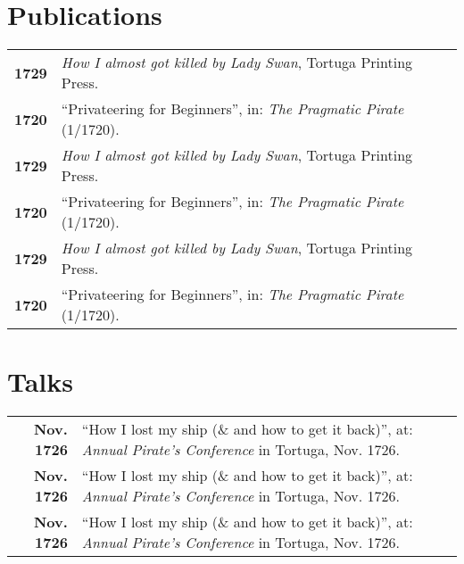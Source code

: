 \documentclass[english]{modernsimplecv}
\newlength{\rightcolwidth}
\begin{document}
\begin{paracol}{2}
{}
\bigskip

\begin{skillsection}{\rightcolwidth}
\end{skillsection}


\bigskip



\vspace{4em}


\begin{minipage}[t]{\rightcolwidth}
\section*{Publications}
\begin{tabular}{>{\footnotesize\bfseries}r >{\footnotesize}p{}}
    1729 & \emph{How I almost got killed by Lady Swan}, Tortuga Printing Press. \\
    1720 & ``Privateering for Beginners'', in: \emph{The Pragmatic Pirate} (1/1720).\\
    1729 & \emph{How I almost got killed by Lady Swan}, Tortuga Printing Press. \\
    1720 & ``Privateering for Beginners'', in: \emph{The Pragmatic Pirate} (1/1720).\\
    1729 & \emph{How I almost got killed by Lady Swan}, Tortuga Printing Press. \\
    1720 & ``Privateering for Beginners'', in: \emph{The Pragmatic Pirate} (1/1720).
\end{tabular}
\bigskip

\section*{Talks}
\begin{tabular}{>{\footnotesize\bfseries}r >{\footnotesize}p{}}
    Nov. 1726 & ``How I lost my ship (\& and how to get it back)'', at: \emph{Annual Pirate's Conference} in Tortuga, Nov. 1726. \\
    Nov. 1726 & ``How I lost my ship (\& and how to get it back)'', at: \emph{Annual Pirate's Conference} in Tortuga, Nov. 1726. \\
    Nov. 1726 & ``How I lost my ship (\& and how to get it back)'', at: \emph{Annual Pirate's Conference} in Tortuga, Nov. 1726.
\end{tabular}
\end{minipage}









\end{paracol}
\end{document}
